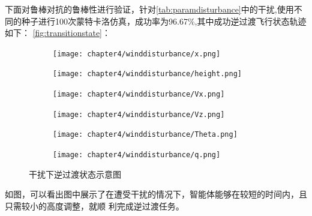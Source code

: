 下面对鲁棒对抗的鲁棒性进行验证，针对\autoref{tab:paramdisturbance}中的干扰,使用不同的种子进行100次蒙特卡洛仿真，成功率为96.67$\%$,其中成功逆过渡飞行状态轨迹如下：
\autoref{fig:transitionstate}：
\begin{figure}[H]
    \centering
    \begin{subfigure}{.55\textwidth}
        \centering
        \texttt{[image: chapter4/winddisturbance/x.png]}
        \label{fig:sub1}
        \end{subfigure}%
        \begin{subfigure}{.55\textwidth}
        \centering
        \texttt{[image: chapter4/winddisturbance/height.png]}
        \label{fig:sub2}
        \end{subfigure}
    \begin{subfigure}{.55\textwidth}
        \centering
        \texttt{[image: chapter4/winddisturbance/Vx.png]}
        \label{fig:sub3}
    \end{subfigure}%
    \begin{subfigure}{.55\textwidth}
        \centering
        \texttt{[image: chapter4/winddisturbance/Vz.png]}
        \label{fig:sub4}
    \end{subfigure}
    \begin{subfigure}{.55\textwidth}
        \centering
        \texttt{[image: chapter4/winddisturbance/Theta.png]}
        \label{fig:sub3}
    \end{subfigure}%
    \begin{subfigure}{.55\textwidth}
        \centering
        \texttt{[image: chapter4/winddisturbance/q.png]}
        \label{fig:sub4}
    \end{subfigure}
\caption{干扰下逆过渡状态示意图}
\label{fig:transitionstate}
\end{figure}
如图，可以看出图中展示了在遭受干扰的情况下，智能体能够在较短的时间内，且只需较小的高度调整，就顺
利完成逆过渡任务。

